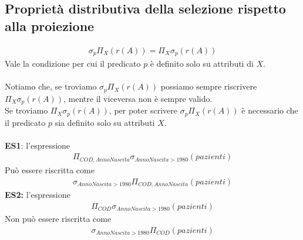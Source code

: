 \subsection{Proprietà distributiva della selezione rispetto alla proiezione}
    \begin{equation}\begin{aligned}
        \sigma_p \Pi_X (r(A)) = \Pi_X \sigma_p (r(A))
    \end{aligned}\end{equation}
Vale la condizione per cui il predicato $p$ è definito solo su attributi di $X$.\\\\
Notiamo che, se troviamo $\sigma_p \Pi_X (r(A))$ possiamo sempre riscrivere $\Pi_X \sigma_p (r(A))$, mentre il viceversa non è sempre valido.\\
Se troviamo $\Pi_X \sigma_p (r(A))$, per poter scrivere $\sigma_p \Pi_X (r(A))$ è necessario che il predicato $p$ sia definito solo su attributi $X$.\\\\
\textbf{ES1}: l'espressione
    \begin{equation}\begin{aligned}
        \Pi_{COD, AnnoNascita} \sigma_{AnnoNascita > 1980} (pazienti)
    \end{aligned}\end{equation}
Può essere riscritta come
    \begin{equation}\begin{aligned}
        \sigma_{AnnoNascita > 1980} \Pi_{COD, AnnoNascita} (pazienti)
    \end{aligned}\end{equation}
\textbf{ES2:} l'espressione
    \begin{equation}\begin{aligned}
        \Pi_{COD} \sigma_{AnnoNascita > 1980} (pazienti)
    \end{aligned}\end{equation}
Non può essere riscritta come
    \begin{equation}\begin{aligned}
        \sigma_{AnnoNascita > 1980} \Pi_{COD} (pazienti)
    \end{aligned}\end{equation}
    
